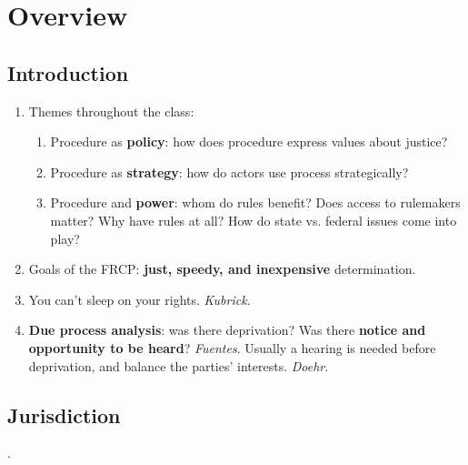 \section{Overview}

\subsection{Introduction}

\begin{enumerate}
    \item Themes throughout the class:
    \begin{enumerate}
        \item Procedure as \textbf{policy}: how does procedure express values 
        about justice?
        \item Procedure as \textbf{strategy}: how do actors use process 
        strategically?
        \item Procedure and \textbf{power}: whom do rules benefit? Does access 
        to rulemakers matter? Why have rules at all? How do state vs. federal 
        issues come into play?
    \end{enumerate}
    \item Goals of the FRCP: \textbf{just, speedy, and inexpensive} 
    determination.
    \item You can't sleep on your rights. \emph{Kubrick}.
    \item \textbf{Due process analysis}: was there deprivation? Was there 
    \textbf{notice and opportunity to be heard}? \emph{Fuentes}. Usually a 
    hearing is needed before deprivation, and balance the parties' interests. 
    \emph{Doehr}.  \end{enumerate}

\subsection{Jurisdiction}.

